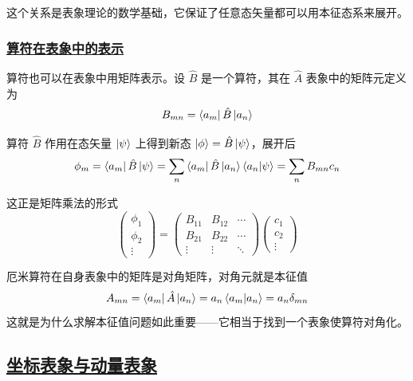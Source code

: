 这个关系是表象理论的数学基础，它保证了任意态矢量都可以用本征态系来展开。

\subsubsection{\protect\hyperlink{:}{算符在表象中的表示}}

算符也可以在表象中用矩阵表示。设 $\hat{B}$ 是一个算符，其在 $\hat{A}$ 表象中的矩阵元定义为
\begin{equation}
    B_{mn} = \bra{a_m}\hat{B}\ket{a_n}
\end{equation}

算符 $\hat{B}$ 作用在态矢量 $\ket{\psi}$ 上得到新态 $\ket{\phi} = \hat{B}\ket{\psi}$，展开后
\begin{equation}
    \phi_m = \bra{a_m}\hat{B}\ket{\psi} = \sum_n \bra{a_m}\hat{B}\ket{a_n}\braket{a_n}{\psi} = \sum_n B_{mn}c_n
\end{equation}

这正是矩阵乘法的形式
\begin{equation}
    \begin{pmatrix}
        \phi_1 \\ \phi_2 \\ \vdots
    \end{pmatrix}
    =
    \begin{pmatrix}
        B_{11} & B_{12} & \cdots \\
        B_{21} & B_{22} & \cdots \\
        \vdots & \vdots & \ddots
    \end{pmatrix}
    \begin{pmatrix}
        c_1 \\ c_2 \\ \vdots
    \end{pmatrix}
\end{equation}

\begin{remark}
    厄米算符在自身表象中的矩阵是对角矩阵，对角元就是本征值
    \begin{equation}
        A_{mn} = \bra{a_m}\hat{A}\ket{a_n} = a_n\braket{a_m}{a_n} = a_n\delta_{mn}
    \end{equation}
    这就是为什么求解本征值问题如此重要——它相当于找到一个表象使算符对角化。
\end{remark}

\subsection{\protect\hyperlink{:}{坐标表象与动量表象}}

